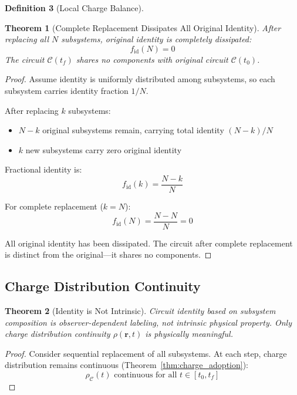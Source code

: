 \documentclass[12pt,a4paper]{article}
\theoremstyle{plain}
\newtheorem{theorem}{Theorem}[section]
\theoremstyle{definition}
\newtheorem{definition}[theorem]{Definition}
\theoremstyle{remark}
\begin{document}
\begin{definition}[Local Charge Balance]
\begin{theorem}[Complete Replacement Dissipates All Original Identity]
\label{thm:complete_replacement}
After replacing all $N$ subsystems, original identity is completely dissipated:
\begin{equation}
f_{\text{id}}(N) = 0
\end{equation}
The circuit $\mathcal{C}(t_f)$ shares no components with original circuit $\mathcal{C}(t_0)$.
\end{theorem}

\begin{proof}
Assume identity is uniformly distributed among subsystems, so each subsystem carries identity fraction $1/N$.

After replacing $k$ subsystems:
\begin{itemize}
\item $N - k$ original subsystems remain, carrying total identity $(N-k)/N$
\item $k$ new subsystems carry zero original identity
\end{itemize}

Fractional identity is:
\begin{equation}
f_{\text{id}}(k) = \frac{N - k}{N}
\end{equation}

For complete replacement ($k = N$):
\begin{equation}
f_{\text{id}}(N) = \frac{N - N}{N} = 0
\end{equation}

All original identity has been dissipated. The circuit after complete replacement is distinct from the original—it shares no components.
\end{proof}

\subsection{Charge Distribution Continuity}

\begin{theorem}[Identity is Not Intrinsic]
\label{thm:identity_not_intrinsic}
Circuit identity based on subsystem composition is observer-dependent labeling, not intrinsic physical property. Only charge distribution continuity $\rho(\mathbf{r},t)$ is physically meaningful.
\end{theorem}

\begin{proof}
Consider sequential replacement of all subsystems. At each step, charge distribution remains continuous (Theorem~\ref{thm:charge_adoption}):
\begin{equation}
\rho_{\mathcal{C}}(t) \text{ continuous for all } t \in [t_0, t_f]
\end{equation}


\end{proof}
\end{definition}
\end{document}
